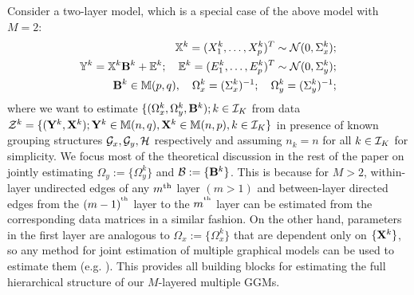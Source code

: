 Consider a two-layer model, which is a special case of the above model with $M=2$:
%
\begin{eqnarray}
{\mathbb{X}}^k = (X^k_1, \ldots, X^k_p)^T \sim {\cal{N}} (0, \Sigma^k_x);\\
{\mathbb{Y}}^k = {\mathbb{X}}^k {\mathbf{B}}^k + {\mathbb{E}}^k; \quad {\mathbb{E}}^k = (E^k_1, \ldots, E^k_p)^T \sim {\cal{N}} (0, \Sigma^k_y);\\
{\mathbf{B}}^k \in {\mathbb{M}}(p,q), \quad \Omega^k_x = (\Sigma^k_x)^{-1}; \quad \Omega^k_y = (\Sigma^k_y)^{-1};
\end{eqnarray}
%
where we want to estimate $\{ (\Omega^k_x, \Omega^k_y, {\mathbf{B}}^k); k \in {\cal{I}}_K$ from data ${\cal{Z}}^k = \{ ({\mathbf{Y}}^k, {\mathbf{X}}^k); {\mathbf{Y}}^k \in {\mathbb{M}}(n,q), {\mathbf{X}}^k \in {\mathbb{M}}(n,p), k \in {\cal{I}}_K\}$ in presence of known grouping structures ${\cal{G}}_x, {\cal{G}}_y, {\cal{H}}$ respectively and assuming $n_k = n$ for all $k \in {\cal{I}}_K$ for simplicity. We focus most of the theoretical discussion in the rest of the paper on jointly estimating $\Omega_y:= \{ \Omega_y^k \}$ and ${\cal{B}} := \{ {\mathbf{B}}^k \}$. This is because for $M>2$, within-layer undirected edges of any $m{\operatorname*{^{\text{th}}}}$ layer $(m>1)$ and between-layer directed edges from the $(m-1)^{\operatorname*{^{\text{th}}}}$ layer to the $m^{\operatorname*{^{\text{th}}}}$ layer can be estimated from the corresponding data matrices in a similar fashion. On the other hand, parameters in the first layer are analogous to $\Omega_x := \{ \Omega_x^k \}$ that are dependent only on $\{ {\mathbf{X}}^k\}$, so any method for joint estimation of multiple graphical models can be used to estimate them (e.g. \cite{GuoEtal11, MaMichailidis15}). This provides all building blocks for estimating the full hierarchical structure of our $M$-layered multiple GGMs.


